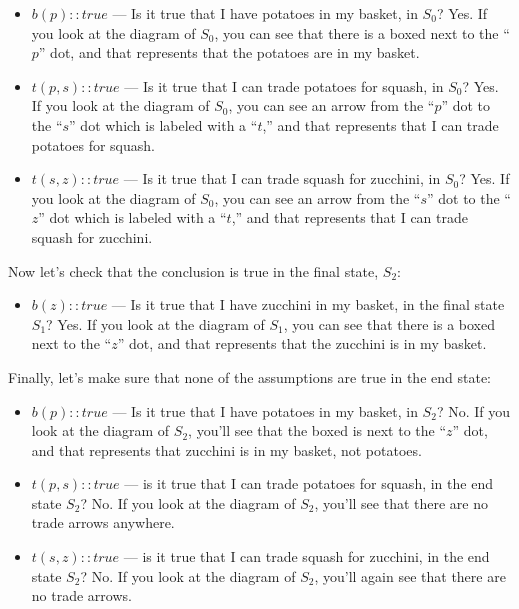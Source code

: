 \documentclass[../../../main.tex]{subfiles}
\begin{document}
\begin{itemize}
  \item{$b(p) :: true$ --- Is it true that I have potatoes in my basket, in $S_{0}$? Yes. If you look at the diagram of $S_{0}$, you can see that there is a boxed  next to the ``$p$'' dot, and that represents that the potatoes are in my basket.}
  \item{$t(p, s) :: true$ --- Is it true that I can trade potatoes for squash, in $S_{0}$? Yes. If you look at the diagram of $S_{0}$, you can see an arrow from the ``$p$'' dot to the ``$s$'' dot which is labeled with a ``$t$,'' and that represents that I can trade potatoes for squash.}
  \item{$t(s, z) :: true$ --- Is it true that I can trade squash for zucchini, in $S_{0}$? Yes. If you look at the diagram of $S_{0}$, you can see an arrow from the ``$s$'' dot to the ``$z$'' dot which is labeled with a ``$t$,'' and that represents that I can trade squash for zucchini.}
\end{itemize}

\noindent
Now let's check that the conclusion is true in the final state, $S_{2}$:

\begin{itemize}
  \item{$b(z) :: true$ --- Is it true that I have zucchini in my basket, in the final state $S_{1}$? Yes. If you look at the diagram of $S_{1}$, you can see that there is a boxed  next to the ``$z$'' dot, and that represents that the zucchini is in my basket.}
\end{itemize}

\noindent
Finally, let's make sure that none of the assumptions are true in the end state:

\begin{itemize}
  \item{$b(p) :: true$ --- Is it true that I have potatoes in my basket, in $S_{2}$? No. If you look at the diagram of $S_{2}$, you'll see that the boxed  is next to the ``$z$'' dot, and that represents that zucchini is in my basket, not potatoes.}
  \item{$t(p, s) :: true$ --- is it true that I can trade potatoes for squash, in the end state $S_{2}$? No. If you look at the diagram of $S_{2}$, you'll see that there are no trade arrows anywhere.}
  \item{$t(s, z) :: true$ --- is it true that I can trade squash for zucchini, in the end state $S_{2}$? No. If you look at the diagram of $S_{2}$, you'll again see that there are no trade arrows.}
\end{itemize}
\end{document}
